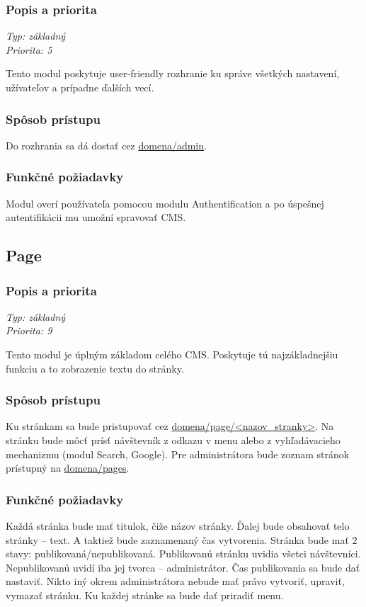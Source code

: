 \documentclass[a4paper,titlepage,11pt]{article}
\begin{document}
\subsubsection{Popis a priorita}
\begin{flushleft}
 \emph{Typ: základný}\\
 \emph{Priorita: 5}\\
\end{flushleft}
Tento modul poskytuje user-friendly rozhranie ku správe všetkých nastavení, užívateľov a prípadne ďalších vecí. 
\subsubsection{Spôsob prístupu}
Do rozhrania sa dá dostať cez \url{domena/admin}.
\subsubsection{Funkčné požiadavky}
Modul overí používateľa pomocou modulu Authentification a po úspešnej autentifikácii mu umožní spravovať CMS.

\subsection{Page}
\subsubsection{Popis a priorita}
\begin{flushleft}
 \emph{Typ: základný}\\
 \emph{Priorita: 9}\\
\end{flushleft}
Tento modul je úplným základom celého CMS. Poskytuje tú najzákladnejšiu funkciu a to zobrazenie textu do stránky. 
\subsubsection{Spôsob prístupu}
Ku stránkam sa bude pristupovať cez \url{domena/page/<nazov_stranky>}.
Na stránku bude môcť prísť návštevník z odkazu v menu alebo z vyhľadávacieho mechanizmu (modul Search, Google). 
Pre administrátora bude zoznam stránok prístupný na \url{domena/pages}.
\subsubsection{Funkčné požiadavky}
Každá stránka bude mať titulok, čiže názov stránky. Ďalej bude obsahovať telo stránky -- text. 
A taktiež bude zaznamenaný čas vytvorenia. Stránka bude mať 2 stavy: publikovaná\slash nepublikovaná. 
Publikovanú stránku uvidia všetci návštevníci. Nepublikovanú uvidí iba jej tvorca -- administrátor. 
Čas publikovania sa bude dať nastaviť. Nikto iný okrem administrátora nebude mať právo vytvoriť, upraviť, vymazať stránku. 
Ku každej stránke sa bude dať priradiť menu.
\end{document}
